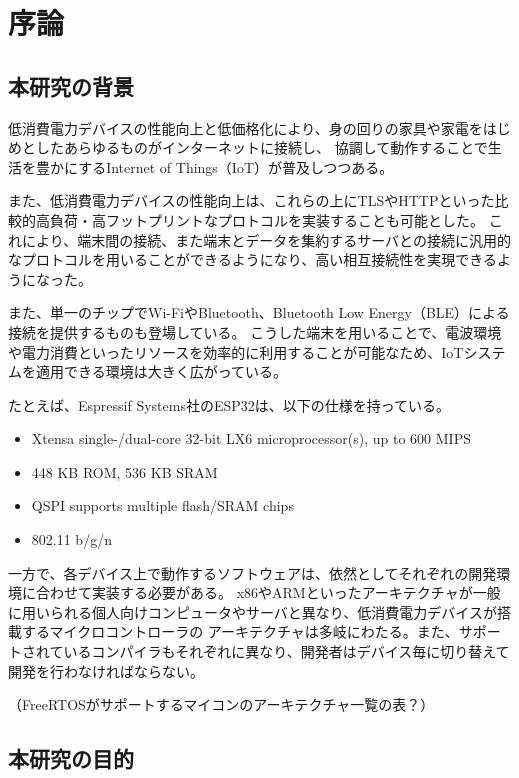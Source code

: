 \chapter{序論}
\label{chap:introduction}

\section{本研究の背景}

低消費電力デバイスの性能向上と低価格化により、身の回りの家具や家電をはじめとしたあらゆるものがインターネットに接続し、
協調して動作することで生活を豊かにするInternet of Things（IoT）が普及しつつある。

また、低消費電力デバイスの性能向上は、これらの上にTLSやHTTPといった比較的高負荷・高フットプリントなプロトコルを実装することも可能とした。
これにより、端末間の接続、また端末とデータを集約するサーバとの接続に汎用的なプロトコルを用いることができるようになり、高い相互接続性を実現できるようになった。

また、単一のチップでWi-FiやBluetooth、Bluetooth Low Energy（BLE）による接続を提供するものも登場している。
こうした端末を用いることで、電波環境や電力消費といったリソースを効率的に利用することが可能なため、IoTシステムを適用できる環境は大きく広がっている。

たとえば、Espressif Systems社のESP32\cite{esp32}は、以下の仕様を持っている。

\begin{itemize}
  \item Xtensa single-/dual-core 32-bit LX6 microprocessor(s), up to 600 MIPS
  \item 448 KB ROM, 536 KB SRAM
  \item QSPI supports multiple flash/SRAM chips
  \item 802.11 b/g/n
\end{itemize}


一方で、各デバイス上で動作するソフトウェアは、依然としてそれぞれの開発環境に合わせて実装する必要がある。
x86やARMといったアーキテクチャが一般に用いられる個人向けコンピュータやサーバと異なり、低消費電力デバイスが搭載するマイクロコントローラの
アーキテクチャは多岐にわたる。また、サポートされているコンパイラもそれぞれに異なり、開発者はデバイス毎に切り替えて開発を行わなければならない。

（FreeRTOSがサポートするマイコンのアーキテクチャ一覧の表？）

\section{本研究の目的}

